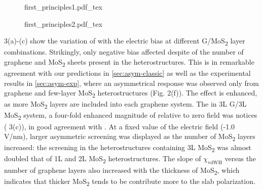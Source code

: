 \begin{figure}[!htbp]
  \centering{}
  {first_principles1.pdf_tex}
  \caption{\label{fig:asym-first-principles1} }
\end{figure}

\begin{figure}[!htbp]
  \centering{}
  {first_principles2.pdf_tex}
  \caption{\label{fig:asym-first-principles1} }
\end{figure}

 3(a)-(c) show the variation of with the electric
bias at different G/MoS\textsubscript{2} layer combinations.
%
Strikingly, only negative bias
affected despite of the number of graphene and MoS\textsubscript{2}
sheets present in the heterostructures. This is in remarkable
agreement with our predictions in \autoref{sec:asym-classic} as well as the experimental results in \autoref{sec:asym-exp}, where an asymmetrical response
was observed only from graphene and few-layer MoS\textsubscript{2}
heterostructures (Fig. 2(f)).
%
The effect is enhanced, as more
MoS\textsubscript{2} layers are included into each graphene
system. The in 3L G/3L MoS\textsubscript{2}
system, a four-fold enhanced magnitude of relative to zero
field was notices ( 3(c)), in good agreement with .
%
At a fixed value of the electric field (-1.0 V/nm), larger asymmetric
screening was displayed as the number of MoS\textsubscript{2} layers
increased: the screening in the heterostructures containing 3L
MoS\textsubscript{2} was almost doubled that of 1L and 2L
MoS\textsubscript{2} heterostructures.
%
The slope of $\chi_{\mathrm{vdWH}}$ versus the number of graphene
layers also increased with the thickness of MoS\textsubscript{2},
which indicates that thicker MoS\textsubscript{2} tends to be
contribute more to the slab polarization.
%
